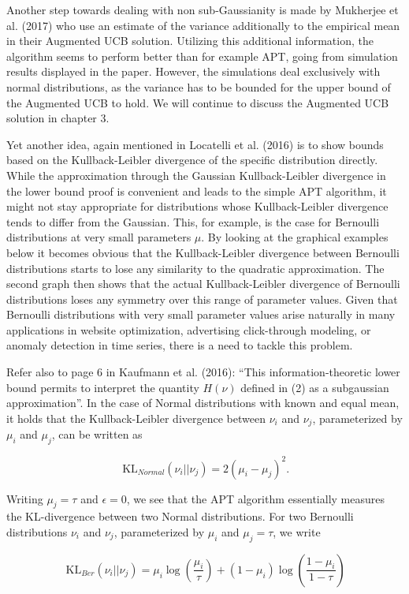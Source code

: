 \documentclass[12pt,]{article}
\newcommand{\KL}{\,\text{KL}}
\begin{document}
Another step towards dealing with non sub-Gaussianity is made by
Mukherjee et al. (2017) who use an estimate of the variance additionally
to the empirical mean in their Augmented UCB solution. Utilizing this
additional information, the algorithm seems to perform better than for
example APT, going from simulation results displayed in the paper.
However, the simulations deal exclusively with normal distributions, as
the variance has to be bounded for the upper bound of the Augmented UCB
to hold. We will continue to discuss the Augmented UCB solution in
chapter 3.

Yet another idea, again mentioned in Locatelli et al. (2016) is to show
bounds based on the Kullback-Leibler divergence of the specific
distribution directly. While the approximation through the Gaussian
Kullback-Leibler divergence in the lower bound proof is convenient and
leads to the simple APT algorithm, it might not stay appropriate for
distributions whose Kullback-Leibler divergence tends to differ from the
Gaussian. This, for example, is the case for Bernoulli distributions at
very small parameters \(\mu\). By looking at the graphical examples
below it becomes obvious that the Kullback-Leibler divergence between
Bernoulli distributions starts to lose any similarity to the quadratic
approximation. The second graph then shows that the actual
Kullback-Leibler divergence of Bernoulli distributions loses any
symmetry over this range of parameter values. Given that Bernoulli
distributions with very small parameter values arise naturally in many
applications in website optimization, advertising click-through
modeling, or anomaly detection in time series, there is a need to tackle
this problem.

Refer also to page 6 in Kaufmann et al. (2016): ``This
information-theoretic lower bound permits to interpret the quantity
\(H(\nu)\) defined in (2) as a subgaussian approximation''. In the case
of Normal distributions with known and equal mean, it holds that the
Kullback-Leibler divergence between \(\nu_i\) and \(\nu_j\),
parameterized by \(\mu_i\) and \(\mu_j\), can be written as

\[
\KL_{Normal}(\nu_i || \nu_j) = 2(\mu_i - \mu_j)^2.
\]

Writing \(\mu_j = \tau\) and \(\epsilon = 0\), we see that the APT
algorithm essentially measures the KL-divergence between two Normal
distributions. For two Bernoulli distributions \(\nu_i\) and \(\nu_j\),
parameterized by \(\mu_i\) and \(\mu_j=\tau\), we write

\[
\KL_{Ber}(\nu_i||\nu_j) = \mu_i \log(\frac{\mu_i}{\tau}) + (1-\mu_i) \log(\frac{1-\mu_i}{1-\tau})
\]
\end{document}
